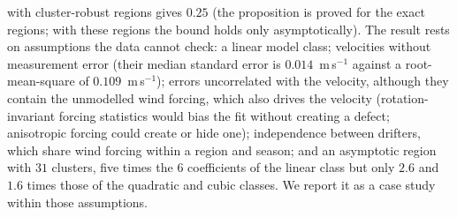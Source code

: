 with cluster-robust regions gives $0.25$ (the proposition is proved for the
exact regions; with these regions the bound holds only asymptotically). The
result rests on assumptions the data cannot check: a linear model class;
velocities without measurement error (their median standard error is
$0.014$~m\,s$^{-1}$ against a root-mean-square of $0.109$~m\,s$^{-1}$); errors
uncorrelated with the velocity, although they contain the unmodelled wind
forcing, which also drives the velocity (rotation-invariant forcing statistics
would bias the fit without creating a defect; anisotropic forcing could create
or hide one); independence between drifters, which share wind forcing within a
region and season; and an asymptotic region with $31$ clusters, five times the
$6$ coefficients of the linear class but only $2.6$ and $1.6$ times those of
the quadratic and cubic classes. We report it as a case study within those
assumptions.

